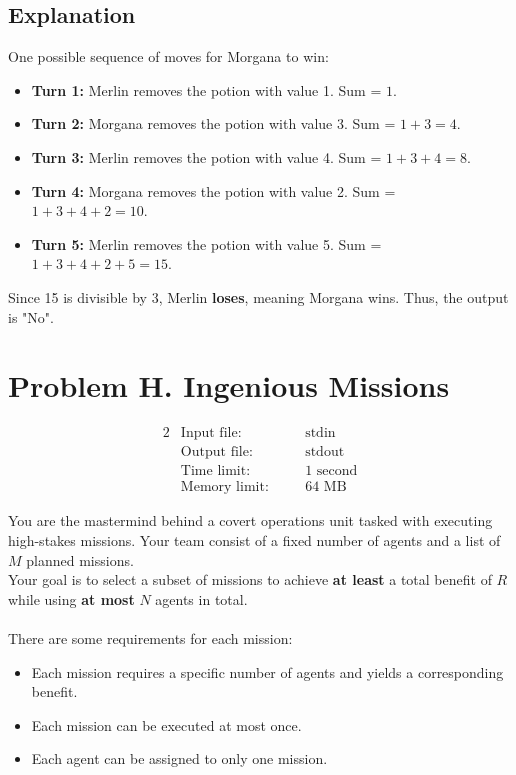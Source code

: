 \documentclass[12pt,a4paper]{article}
\begin{document}
\subsection*{\fontsize{16}{12}Explanation}
One possible sequence of moves for Morgana to win:
\begin{itemize}
    \item \textbf{Turn 1:} Merlin removes the potion with value 1. Sum = \( 1 \).
    \item \textbf{Turn 2:} Morgana removes the potion with value 3. Sum = \( 1 + 3 = 4 \).
    \item \textbf{Turn 3:} Merlin removes the potion with value 4. Sum = \( 1 + 3 + 4 = 8 \).
    \item \textbf{Turn 4:} Morgana removes the potion with value 2. Sum = \( 1 + 3 + 4 + 2 = 10 \).
    \item \textbf{Turn 5:} Merlin removes the potion with value 5. Sum = \( 1 + 3 + 4 + 2 + 5 = 15 \).
\end{itemize}
Since 15 is divisible by 3, Merlin \textbf{loses}, meaning Morgana wins. Thus, the output is "No".

\newpage

\section*{\fontsize{18}{12}Problem H. Ingenious Missions}

\begin{alignat*} {2}
 &   \text{Input file:}   \quad     &&\text{stdin}\\
 &   \text{Output file:}  \quad     &&\text{stdout}\\
 &   \text{Time limit:}   \quad     &&\text{1 second}\\
 &   \text{Memory limit:} \quad     &&\text{64 MB}
\end{alignat*}

\noindent
You are the mastermind behind a covert operations unit tasked with executing high-stakes missions. Your team consist of a fixed number of agents and a list of \( M \) planned missions. 
\\
\noindent
Your goal is to select a subset of missions to achieve \textbf{at least} a total benefit of \( R \) while using \textbf{at most} \( N \) agents in total.
\\\\
\noindent
There are some requirements for each mission:
\begin{itemize}
  \item Each mission requires a specific number of agents and yields a corresponding benefit.
  \item Each mission can be executed at most once.
  \item Each agent can be assigned to only one mission.
\end{itemize}
\end{document}

